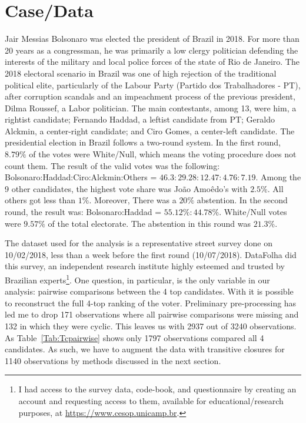 \documentclass[hidelinks,11pt]{article}
\begin{document}
\section{Case/Data}

Jair Messias Bolsonaro was elected the president of Brazil in 2018. For more
than 20 years as a congressman, he was primarily a low clergy politician defending
the interests of the military and local police forces of the state of Rio de
Janeiro. The 2018 electoral scenario in Brazil was one of high rejection of the
traditional political elite, particularly of the Labour Party (Partido dos
Trabalhadores - PT), after corruption scandals and an impeachment process of the
previous president, Dilma Roussef, a Labor politician. The main contestants,
among 13, were him, a rightist candidate; Fernando Haddad, a leftist candidate
from PT; Geraldo Alckmin, a center-right candidate; and Ciro Gomes, a
center-left candidate. The presidential election in Brazil follows a two-round
system. In the first round, \(8.79\%\) of the votes were White/Null, which means
the voting procedure does not count them. The result of the valid votes was the
following: Bolsonaro:Haddad:Ciro:Alckmin:Others =
\(46.3:29.28:12.47:4.76:7.19 \). Among the 9 other candidates, the highest vote
share was Jo{\~a}o Amo{\^e}do's with \(2.5\%\). All others got less than \(1\%\).
Moreover, There was a \(20\%\) abstention. In the second round, the result was:
Bolsonaro:Haddad = \(55.12\% : 44.78\% \). White/Null votes were \(9.57\%\) of
the total electorate. The abstention in this round was \(21.3\%\).


The dataset used for the analysis is a representative street survey done on
10/02/2018, less than a week before the first round (10/07/2018). DataFolha did this survey, an independent research institute highly esteemed and
trusted by Brazilian experts\footnote{I had access to the survey data, code-book, and
  questionnaire by creating an account and requesting access to them,
  available for educational/research purposes, at
  \url{https://www.cesop.unicamp.br}.}. One question, in particular, is the only
variable in our analysis: pairwise comparisons between the 4 top candidates.
With it is possible to reconstruct the full 4-top ranking of the voter.
Preliminary pre-processing has led me to drop 171 observations where all
pairwise comparisons were missing and 132 in which they were cyclic. This leaves
us with 2937 out of 3240 observations. As Table~\ref{Tab:Tcpairwise} shows only
1797 observations compared all 4 candidates. As such, we have to augment the
data with transitive closures for 1140 observations by methods discussed in the
next section.
\end{document}
